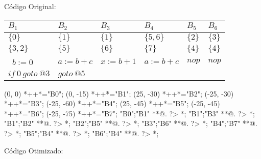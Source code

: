 C\'odigo Original:

\begin{table}[ht]
\begin{scriptsize}
\begin{tabular}{l|l|l|l|l|l}
$B_{1}$ & $B_{2}$ & $B_{3}$ & $B_{4}$ & $B_{5}$ & $B_{6}$ \\
\hline
$\{0\}$ & $\{1\}$ & $\{1\}$ & $\{5, 6\}$ & $\{2\}$ & $\{3\}$ \\
$\{3, 2\}$ & $\{5\}$ & $\{6\}$ & $\{7\}$ & $\{4\}$ & $\{4\}$ \\
\hline\
$b:=0$ & $a:=b+c$ & $x:=b+1$ & $a:=b+c$ & $nop$ & $nop$ \\
$if\:0\:goto\:@3$ & $goto\:@5$ &  &  &  &  \\
\end{tabular}
\end{scriptsize}
\end{table}

\begin{scriptsize}
\xy(0, 0)
	*++{}*\frm{-,}="B0";
(0, -15)
	*++{}*\frm{-,}="B1";
(25, -30)
	*++{}*\frm{-,}="B2";
(-25, -30)
	*++{}*\frm{-,}="B3";
(-25, -60)
	*++{}*\frm{-,}="B4";
(25, -45)
	*++{}*\frm{-,}="B5";
(-25, -45)
	*++{}*\frm{-,}="B6";
(-25, -75)
	*++{}*\frm{-,}="B7";
"B0";"B1" **@{.} ?> *{\dir{>}};
"B1";"B3" **@{.} ?> *{\dir{>}};
"B1";"B2" **@{.} ?> *{\dir{>}};
"B2";"B5" **@{.} ?> *{\dir{>}};
"B3";"B6" **@{.} ?> *{\dir{>}};
"B4";"B7" **@{.} ?> *{\dir{>}};
"B5";"B4" **@{.} ?> *{\dir{>}};
"B6";"B4" **@{.} ?> *{\dir{>}};
\endxy
\end{scriptsize}


C\'odigo Otimizado:

